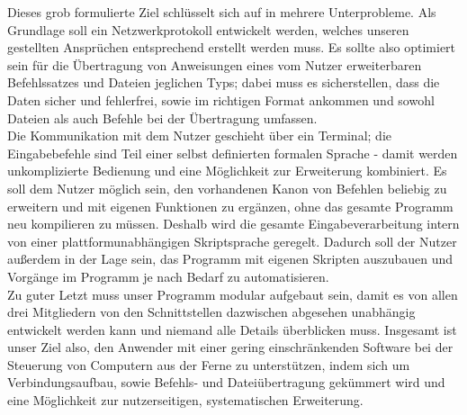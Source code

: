 Dieses grob formulierte Ziel schlüsselt sich auf in mehrere Unterprobleme. Als Grundlage soll ein Netzwerkprotokoll entwickelt werden, welches unseren gestellten Ansprüchen entsprechend erstellt werden muss. 
Es sollte also optimiert sein für die Übertragung von Anweisungen eines vom Nutzer erweiterbaren Befehlssatzes und Dateien jeglichen Typs; dabei muss es sicherstellen, dass die Daten sicher und fehlerfrei, sowie im richtigen Format ankommen und sowohl Dateien als auch Befehle bei der Übertragung umfassen.\\
Die Kommunikation mit dem Nutzer geschieht über ein Terminal; die Eingabebefehle sind Teil einer selbst definierten formalen Sprache - damit werden unkomplizierte Bedienung und eine Möglichkeit zur Erweiterung kombiniert.
Es soll dem Nutzer möglich sein, den vorhandenen Kanon von Befehlen beliebig zu erweitern und mit eigenen Funktionen zu ergänzen, ohne das gesamte Programm neu kompilieren zu müssen. Deshalb wird die gesamte Eingabeverarbeitung intern von einer plattformunabhängigen Skriptsprache geregelt.
Dadurch soll der Nutzer außerdem in der Lage sein, das Programm mit eigenen Skripten auszubauen und Vorgänge im Programm je nach Bedarf zu automatisieren.\\
Zu guter Letzt muss unser Programm modular aufgebaut sein, damit es von allen drei Mitgliedern von den Schnittstellen dazwischen abgesehen unabhängig entwickelt werden kann und niemand alle Details überblicken muss.
Insgesamt ist unser Ziel also, den Anwender mit einer gering einschränkenden Software bei der Steuerung von Computern aus der Ferne zu unterstützen, indem sich um Verbindungsaufbau, sowie Befehls- und Dateiübertragung gekümmert wird und eine Möglichkeit zur nutzerseitigen, systematischen Erweiterung.

%